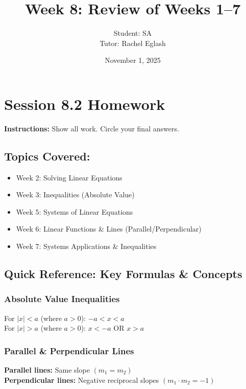 \documentclass[12pt]{article}
\title{Week 8: Review of Weeks 1--7}
\author{
	Student: SA\\
	Tutor: Rachel Eglash}
\date{November 1, 2025}
\begin{document}
	
	\maketitle

	\section*{Session 8.2 Homework}
        
        \textbf{Instructions:} Show all work. Circle your final answers.
        
        \subsection*{Topics Covered:}
        \begin{itemize}
            \item Week 2: Solving Linear Equations
            \item Week 3: Inequalities (Absolute Value)
            \item Week 5: Systems of Linear Equations
            \item Week 6: Linear Functions \& Lines (Parallel/Perpendicular)
            \item Week 7: Systems Applications \& Inequalities
        \end{itemize}
	    
        \newpage
	
	    \subsection*{Quick Reference: Key Formulas \& Concepts}
	
	        \subsubsection*{Absolute Value Inequalities}
		    	For $|x| < a$ (where $a > 0$): $-a < x < a$ \\
                For $|x| > a$ (where $a > 0$): $x < -a$ OR $x > a$
	
	        \subsubsection*{Parallel \& Perpendicular Lines}
			    \textbf{Parallel lines:} Same slope $(m_1 = m_2)$ \\
                \textbf{Perpendicular lines:} Negative reciprocal slopes $(m_1 \cdot m_2 = -1)$
	
\end{document}
